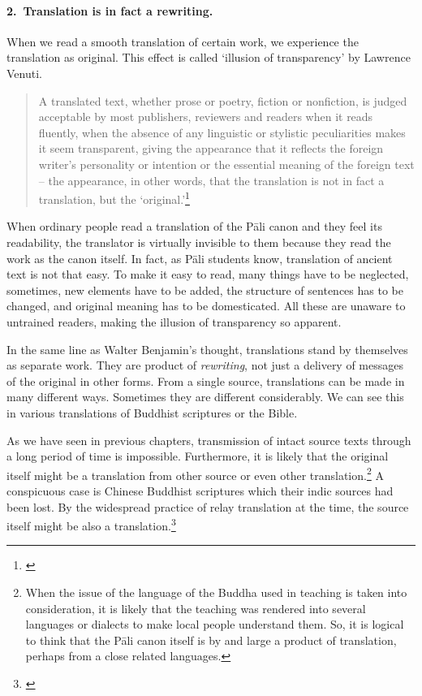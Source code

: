 \paragraph*{2.\ Translation is in fact a rewriting.} When we read a smooth translation of certain work, we experience the translation as original. This effect is called `illusion of transparency' by Lawrence Venuti.

\begin{quote}
A translated text, whether prose or poetry, fiction or nonfiction, is judged acceptable by most publishers, reviewers and readers when it reads fluently, when the absence of any linguistic or stylistic peculiarities makes it seem transparent, giving the appearance that it reflects the
foreign writer's personality or intention or the essential meaning of the foreign text -- the appearance, in other words, that the translation is not in fact a translation, but the `original.'\footnote{\citealp[p.~1]{venuti:invisibility}}
\end{quote}

When ordinary people read a translation of the P\=ali canon and they feel its readability, the translator is virtually invisible to them because they read the work as the canon itself. In fact, as P\=ali students know, translation of ancient text is not that easy. To make it easy to read, many things have to be neglected, sometimes, new elements have to be added, the structure of sentences has to be changed, and original meaning has to be domesticated. All these are unaware to untrained readers, making the illusion of transparency so apparent.

In the same line as Walter Benjamin's thought, translations stand by themselves as separate work. They are product of \emph{rewriting}, not just a delivery of messages of the original in other forms. From a single source, translations can be made in many different ways. Sometimes they are different considerably. We can see this in various translations of Buddhist scriptures or the Bible.

As we have seen in previous chapters, transmission of intact source texts through a long period of time is impossible. Furthermore, it is likely that the original itself might be a translation from other source or even other translation.\footnote{When the issue of the language of the Buddha used in teaching is taken into consideration, it is likely that the teaching was rendered into several languages or dialects to make local people understand them. So, it is logical to think that the P\=ali canon itself is by and large a product of translation, perhaps from a close related languages.} A conspicuous case is Chinese Buddhist scriptures which their indic sources had been lost. By the widespread practice of relay translation at the time, the source itself might be also a translation.\footnote{\citealp[p.~47]{neather:buddhism}}

